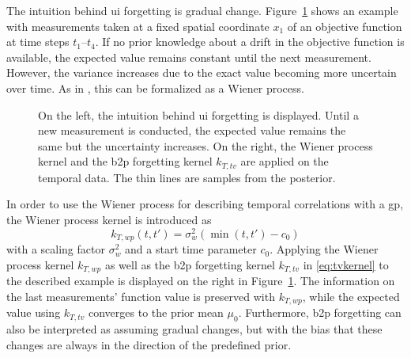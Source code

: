 The intuition behind \gls{ui} forgetting is gradual change. Figure~\ref{fig:intuition_ui} shows an example with measurements taken at a fixed spatial coordinate $x_1$ of an objective function at time steps $t_1$--$t_4$. If no prior knowledge about a drift in the objective function is available, the expected value remains constant until the next measurement. However, the variance increases due to the exact value becoming more uncertain over time. As in \textcite{Slivkins_2008}, this can be formalized as a Wiener process.
\begin{figure}[t]
    \centering
    
    \caption[Visualization of the intuition behind \gls{ui} forgetting.]{On the left, the intuition behind \gls{ui} forgetting is displayed. Until a new measurement is conducted, the expected value remains the same but the uncertainty increases. On the right, the Wiener process kernel and the \gls{b2p} forgetting kernel $k_{T,tv}$ are applied on the temporal data. The thin lines are samples from the posterior.}
    \label{fig:intuition_ui}
\end{figure}
In order to use the Wiener process for describing temporal correlations with a \gls{gp}, the Wiener process kernel is introduced as
\begin{equation}
    k_{T,wp}(t,t') = \sigma_w^2 \left( \min(t,t') - c_0\right)
    \label{eq:wienerprocesskernel}
\end{equation}
with a scaling factor $\sigma_w^2$ and a start time parameter $c_0$. Applying the Wiener process kernel $k_{T,wp}$ as well as the \gls{b2p} forgetting kernel $k_{T,tv}$ in \eqref{eq:tvkernel} to the described example is displayed on the right in Figure~\ref{fig:intuition_ui}. The information on the last measurements' function value is preserved with $k_{T,wp}$, while the expected value using $k_{T,tv}$ converges to the prior mean $\mu_0$.
Furthermore, \gls{b2p} forgetting can also be interpreted as assuming gradual changes, but with the bias that these changes are always in the direction of the predefined prior.

